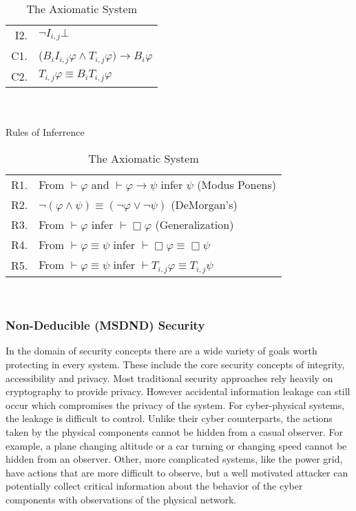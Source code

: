 \begin{table}[!t]
\begin{tabular}{r l}
I2. & $\neg I_{i,j} \bot$ \\
C1. & ($B_i I_{i,j} \varphi \wedge T_{i,j} \varphi) \rightarrow B_i \varphi$ \\
C2. & $T_{i,j} \varphi \equiv B_i T_{i,j} \varphi$ \\
\end{tabular} \\~\\
Rules of Inferrence \\
\begin{tabular}{r l}
R1. & From $\vdash \varphi$ and $\vdash \varphi \rightarrow \psi$ infer $\psi$ (Modus Ponens) \\
R2. & $\neg (\varphi \wedge \psi) \equiv (\neg \varphi \vee \neg \psi)$ (DeMorgan's)\\
R3. & From $\vdash \varphi$ infer $\vdash \Box \varphi$ (Generalization)\\
R4. & From $\vdash \varphi \equiv \psi$ infer $\vdash \Box \varphi \equiv \Box \psi$\\
R5. & From $\vdash \varphi \equiv \psi$ infer $\vdash T_{i,j} \varphi \equiv T_{i,j} \psi$\\
\end{tabular} \\
\caption{The Axiomatic System}
\label{tab:axiomaticsys}
\end{table}

\subsubsection{Non-Deducible (MSDND) Security}

In the domain of security concepts there are a wide variety of goals worth protecting in every system. These include the core security concepts of integrity, accessibility and privacy. Most traditional security approaches rely heavily on cryptography to provide privacy. However accidental information leakage can still occur which compromises the privacy of the system. For cyber-physical systems, the leakage is difficult to control. Unlike their cyber counterparts, the actions taken by the physical components cannot be hidden from a casual observer. For example, a plane changing altitude or a car turning or changing speed cannot be hidden from an observer. Other, more complicated systems, like the power grid, have actions that are more difficult to observe, but a well motivated attacker can potentially collect critical information about the behavior of the cyber components with observations of the physical network.

